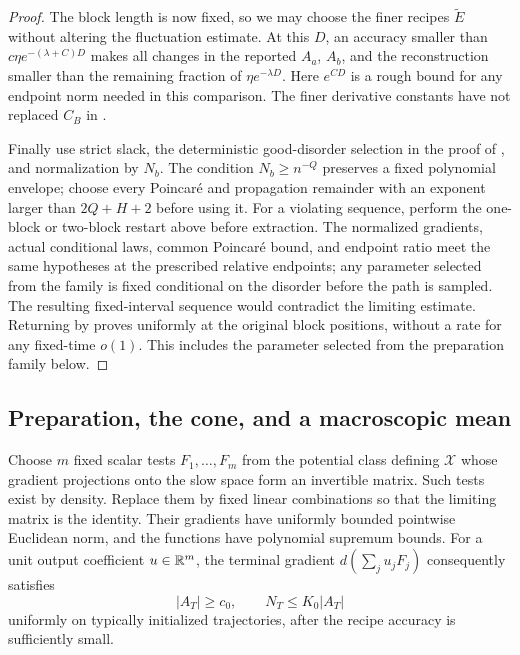 \begin{proof}
The block length is now fixed, so we may choose the finer recipes
$\widetilde E$ without altering the fluctuation estimate.  At this
$D$, an accuracy smaller than
$c\eta e^{-(\lambda+C)D}$ makes all changes in the reported $A_a$,
$A_b$, and the reconstruction smaller than the remaining fraction
of $\eta e^{-\lambda D}$.  Here $e^{CD}$ is a rough bound for any
endpoint norm needed in this comparison.  The finer derivative
constants have not replaced $C_B$ in
.

Finally use strict slack, the deterministic good-disorder selection
in the proof of , and normalization by $N_b$.
The condition $N_b\ge n^{-Q}$ preserves a fixed polynomial envelope;
choose every Poincar\'e and propagation remainder with an exponent
larger than $2Q+H+2$ before using it.  For a violating sequence, perform the one-block or two-block restart
above before extraction.  The normalized gradients, actual conditional
laws, common Poincar\'e bound, and endpoint ratio meet the same
hypotheses at the prescribed relative endpoints; any parameter selected from the family is
fixed conditional on the disorder before the path is sampled.
The resulting fixed-interval sequence would contradict the limiting
estimate.  Returning by  proves
 uniformly at the original block positions,
without a rate for any fixed-time $o(1)$.  This includes the
parameter selected from the preparation family below.
\end{proof}

\subsection{Preparation, the cone, and a macroscopic mean}

Choose $m$ fixed scalar tests $F_1,\ldots,F_m$ from the potential
class defining $\mathcal X$ whose gradient projections onto the
slow space form an invertible matrix.  Such tests exist by density.
Replace them by fixed linear combinations so that the limiting
matrix is the identity.  Their gradients have uniformly bounded
pointwise Euclidean norm, and the functions have polynomial
supremum bounds.  For a unit output coefficient $u\in\mathbb R^m$, the
terminal gradient $d(\sum_j u_jF_j)$ consequently satisfies
\begin{equation}
 |A_T|\ge c_0,\qquad N_T\le K_0|A_T|
 \label{eq:cutoff-terminal-cone}
\end{equation}
uniformly on typically initialized trajectories, after the recipe
accuracy is sufficiently small.


